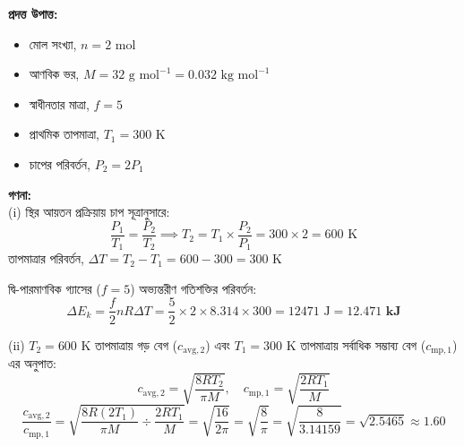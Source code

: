 \documentclass[12pt, a4paper]{article}
\begin{document}
\begin{tcolorbox}[solutionbox={সমাধান (Solution)}]
    \noindent
    \textbf{প্রদত্ত উপাত্ত:}
    \begin{itemize}[leftmargin=1.5em, itemsep=0.2em]
        \item মোল সংখ্যা, $n = 2\text{ mol}$
        \item আণবিক ভর, $M = 32\text{ g mol}^{-1} = 0.032\text{ kg mol}^{-1}$
        \item স্বাধীনতার মাত্রা, $f = 5$
        \item প্রাথমিক তাপমাত্রা, $T_1 = 300\text{ K}$
        \item চাপের পরিবর্তন, $P_2 = 2P_1$
    \end{itemize}

    \vspace{0.6em}
    \noindent\textbf{গণনা:} \\
    (i) স্থির আয়তন প্রক্রিয়ায় চাপ সূত্রানুসারে:
    \[ \frac{P_1}{T_1} = \frac{P_2}{T_2} \implies T_2 = T_1 \times \frac{P_2}{P_1} = 300 \times 2 = 600\text{ K} \]
    তাপমাত্রার পরিবর্তন, $\Delta T = T_2 - T_1 = 600 - 300 = 300\text{ K}$
    
    \vspace{0.4em}
    দ্বি-পারমাণবিক গ্যাসের ($f = 5$) অভ্যন্তরীণ গতিশক্তির পরিবর্তন:
    \[ \Delta E_k = \frac{f}{2} n R \Delta T = \frac{5}{2} \times 2 \times 8.314 \times 300 = 12471\text{ J} = \mathbf{12.471\text{ kJ}} \]
    
    (ii) $T_2 = 600\text{ K}$ তাপমাত্রায় গড় বেগ ($c_{\text{avg},2}$) এবং $T_1 = 300\text{ K}$ তাপমাত্রায় সর্বাধিক সম্ভাব্য বেগ ($c_{\text{mp},1}$) এর অনুপাত:
    \[ c_{\text{avg},2} = \sqrt{\frac{8 R T_2}{\pi M}}, \quad c_{\text{mp},1} = \sqrt{\frac{2 R T_1}{M}} \]
    \[ \frac{c_{\text{avg},2}}{c_{\text{mp},1}} = \sqrt{\frac{8 R (2 T_1)}{\pi M} \div \frac{2 R T_1}{M}} = \sqrt{\frac{16}{2\pi}} = \sqrt{\frac{8}{\pi}} = \sqrt{\frac{8}{3.14159}} = \sqrt{2.5465} \approx \mathbf{1.60} \]
\end{tcolorbox}
\end{document}
